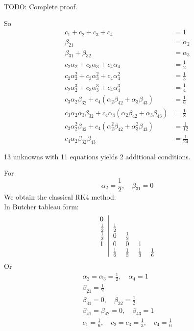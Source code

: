 \documentclass[10pt]{amsart}
\begin{document}
\begin{multicols*}{2}
TODO: Complete proof.

So
\begin{equation}
\begin{aligned}
	c_1 + c_2 + c_3 + c_4 & = 1 \\
	\beta_{21} & = \alpha_2 \\
	\beta_{31} + \beta_{32} & = \alpha_3 \\
	c_2 \alpha_2 + c_3 \alpha_3 + c_4 \alpha_4 & = \frac{1}{2} \\
	c_2 \alpha_2^2 + c_3 \alpha_3^2 + c_4 \alpha_4^2 & = \frac{1}{3} \\
	c_2 \alpha_2^3 + c_3 \alpha_3^3 + c_4 \alpha_4^3 & = \frac{1}{4} \\
	c_3 \alpha_2 \beta_{32} + c_4 (\alpha_2 \beta_{42} + \alpha_3 \beta_{43}) & = \frac{1}{6} \\
	c_3 \alpha_2 \alpha_3 \beta_{32} + c_4 \alpha_4 (\alpha_2 \beta_{42} + \alpha_3 \beta_{43}) & = \frac{1}{8} \\
	c_3 \alpha_2^2  \beta_{32} + c_4  (\alpha_2^2 \beta_{42} + \alpha_3^2 \beta_{43}) & = \frac{1}{12} \\
	c_4 \alpha_2 \beta_{32} \beta_{43} & = \frac{1}{24}
\end{aligned}
\end{equation}

13 unknowns with 11 equations yields 2 additional conditions.

For
\[
\alpha_2 = \frac{1}{2}, \quad \beta_{31} =0 
\]
We obtain the classical RK4 method: \\

In Butcher tableau form:
\[
\begin{tabular}{ l|c c c c }
	0 & & & &  \\
	$\frac{1}{2}$ & $\frac{1}{2}$ &  & &  \\ 
	$\frac{1}{2}$ & $0$ & $\frac{1}{2}$ & &  \\ 
	$1$ & $0$ & $0$ & 1 &  \\
	& $\frac{1}{6}$ & $\frac{1}{3}$ & $\frac{1}{3}$ & $\frac{1}{6}$  \\
\end{tabular}
\]
Or
\[
\begin{gathered}
	\alpha_2 = \alpha_3 = \frac{1}{2}, \quad \alpha_4 = 1 \\
	\beta_{21} = \frac{1}{2} \\
	\beta_{31} = 0, \quad \beta_{32} = \frac{1}{2} \\
	\beta_{41} = \beta_{42} = 0, \quad \beta_{43}=1 \\
	c_1 = \frac{1}{6}, \quad c_2 = c_3 = \frac{1}{3}, \quad c_4 = \frac{1}{6}
\end{gathered}
\]



\end{multicols*}
\end{document}
